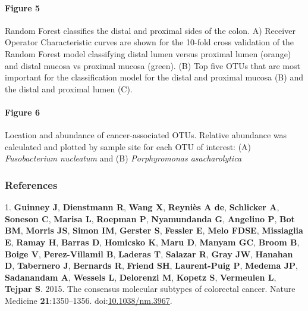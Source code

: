 \documentclass[11pt,]{article}
\let\oldparagraph\paragraph
\renewcommand{\paragraph}[1]{\oldparagraph{#1}\mbox{}}
\begin{document}
\newpage

\paragraph{Figure 5}\label{figure-5}

Random Forest classifies the distal and proximal sides of the colon. A)
Receiver Operator Characteristic curves are shown for the 10-fold cross
validation of the Random Forest model classifying distal lumen versus
proximal lumen (orange) and distal mucosa vs proximal mucosa (green).
(B) Top five OTUs that are most important for the classification model
for the distal and proximal mucosa (B) and the distal and proximal lumen
(C).

\newpage

\paragraph{Figure 6}\label{figure-6}

Location and abundance of cancer-associated OTUs. Relative abundance was
calculated and plotted by sample site for each OTU of interest: (A)
\emph{Fusobacterium nucleatum} and (B) \emph{Porphyromonas
asacharolytica}

\subsubsection*{References}\label{references}

\hypertarget{refs}{}
\hypertarget{ref-Guinney2015}{}
1. \textbf{Guinney J}, \textbf{Dienstmann R}, \textbf{Wang X},
\textbf{Reyniès A de}, \textbf{Schlicker A}, \textbf{Soneson C},
\textbf{Marisa L}, \textbf{Roepman P}, \textbf{Nyamundanda G},
\textbf{Angelino P}, \textbf{Bot BM}, \textbf{Morris JS}, \textbf{Simon
IM}, \textbf{Gerster S}, \textbf{Fessler E}, \textbf{Melo FDSE},
\textbf{Missiaglia E}, \textbf{Ramay H}, \textbf{Barras D},
\textbf{Homicsko K}, \textbf{Maru D}, \textbf{Manyam GC}, \textbf{Broom
B}, \textbf{Boige V}, \textbf{Perez-Villamil B}, \textbf{Laderas T},
\textbf{Salazar R}, \textbf{Gray JW}, \textbf{Hanahan D},
\textbf{Tabernero J}, \textbf{Bernards R}, \textbf{Friend SH},
\textbf{Laurent-Puig P}, \textbf{Medema JP}, \textbf{Sadanandam A},
\textbf{Wessels L}, \textbf{Delorenzi M}, \textbf{Kopetz S},
\textbf{Vermeulen L}, \textbf{Tejpar S}. 2015. The consensus molecular
subtypes of colorectal cancer. Nature Medicine \textbf{21}:1350--1356.
doi:\href{https://doi.org/10.1038/nm.3967}{10.1038/nm.3967}.
\end{document}
